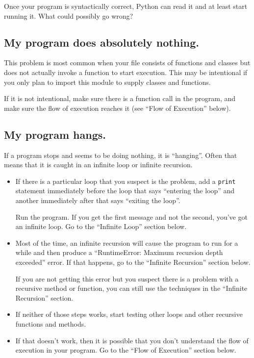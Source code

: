 \documentclass[10pt]{book}
\begin{document}
Once your program is syntactically correct,
Python can read it and at least start running it.  What could
possibly go wrong?


\subsection{My program does absolutely nothing.}

This problem is most common when your file consists of functions and
classes but does not actually invoke a function to start execution.
This may be intentional if you only plan to import this module to
supply classes and functions.

If it is not intentional, make sure there is a function call
in the program, and make sure the flow of execution reaches
it (see ``Flow of Execution'' below).


\subsection{My program hangs.}

If a program stops and seems to be doing nothing, it is ``hanging''.
Often that means that it is caught in an infinite loop or infinite
recursion.

\begin{itemize}

\item If there is a particular loop that you suspect is the
problem, add a {\tt print} statement immediately before the loop that says
``entering the loop'' and another immediately after that says
``exiting the loop''.

Run the program.  If you get the first message and not the second,
you've got an infinite loop.  Go to the ``Infinite Loop'' section
below.

\item Most of the time, an infinite recursion will cause the program
to run for a while and then produce a ``RuntimeError: Maximum
recursion depth exceeded'' error.  If that happens, go to the
``Infinite Recursion'' section below.

If you are not getting this error but you suspect there is a problem
with a recursive method or function, you can still use the techniques
in the ``Infinite Recursion'' section.

\item If neither of those steps works, start testing other
loops and other recursive functions and methods.

\item If that doesn't work, then it is possible that
you don't understand the flow of execution in your program.
Go to the ``Flow of Execution'' section below.

\end{itemize}
\end{document}
